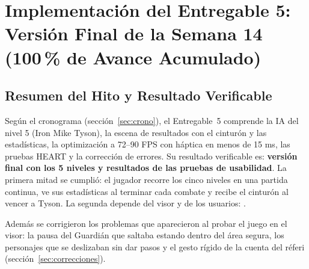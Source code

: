 \section{Implementación del Entregable 5: Versión Final de la Semana 14 (100\,\% de Avance Acumulado)}
\label{sec:e5}
\subsection{Resumen del Hito y Resultado Verificable}
Según el cronograma (sección~\ref{sec:crono}), el Entregable~5 comprende la IA del nivel 5 (Iron Mike Tyson), la escena de resultados con el cinturón y las estadísticas, la optimización a 72--90 FPS con háptica en menos de 15 ms, las pruebas HEART y la corrección de errores. Su resultado verificable es: \textbf{versión final con los 5 niveles y resultados de las pruebas de usabilidad}. La primera mitad se cumplió: el jugador recorre los cinco niveles en una partida continua, ve sus estadísticas al terminar cada combate y recibe el cinturón al vencer a Tyson. La segunda depende del visor y de los usuarios: .

Además se corrigieron los problemas que aparecieron al probar el juego en el visor: la pausa del Guardián que saltaba estando dentro del área segura, los personajes que se deslizaban sin dar pasos y el gesto rígido de la cuenta del réferi (sección~\ref{sec:correcciones}).

\begin{table}[H]
\centering
\caption{Bloques de trabajo del Entregable 5.}
\end{table}

